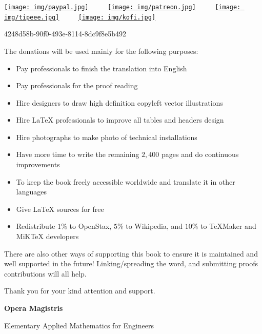 \documentclass[12pt,a4paper,twoside,openright]{report}
\newcounter{def}
\theoremstyle{definition}
\theoremstyle{itexmp}
\numberwithin{equation}{section}
\begin{document}
	\begin{center}
	\href{http://www.sciences.ch/htmlfr/donate.php}{\texttt{[image: img/paypal.jpg]}} $\qquad$ \href{https://www.patreon.com/sciences}{\texttt{[image: img/patreon.jpg]}} $\qquad$ \href{https://www.tipeee.com/elements-of-applied-mathematics}{\texttt{[image: img/tipeee.jpg]}} $\qquad$ \href{http://ko-fi.com/operamagistris}{\texttt{[image: img/kofi.jpg]}}
	\end{center}
	\begin{center}
		{\large \faBitcoin} 4248d58b-90f0-493e-8114-8dc9f8e5b492
	\end{center}
	The donations will be used mainly for the following purposes:
	\begin{itemize}
		\item Pay professionals to finish the translation into English
		\item Pay professionals for the proof reading
		\item Hire designers to draw high definition copyleft vector illustrations
		\item Hire \LaTeX{} professionals to improve all tables and headers design
		\item Hire photographs to make photo of technical installations
		\item Have more time to write the remaining $2,400$ pages and do continuous improvements
		\item To keep the book freely accessible worldwide and translate it in other languages
		\item Give \LaTeX{} sources for free
		\item Redistribute $1\%$ to OpenStax, $5\%$ to Wikipedia, and $10\%$ to TeXMaker and MiKTeX developers
	\end{itemize}
	There are also other ways of supporting this book to ensure it is maintained and well supported in the future! Linking/spreading the word, and submitting proofs contributions will all help.
	
	Thank you for your kind attention and support.
	
	\newpage\null\thispagestyle{empty}\newpage %
	\pagestyle{empty}
	\pagecolor{gray}
	{\Huge \textbf{Opera Magistris}}
	
	{\LARGE Elementary Applied Mathematics for Engineers}
\end{document}
